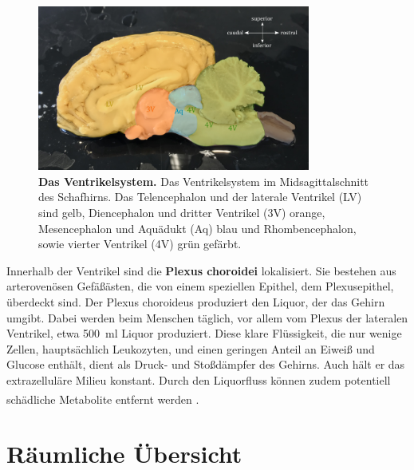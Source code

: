 \documentclass[12pt,a4paper,pdftex]{article}
\begin{document}
\begin{figure}[H]
	\centering
	\includegraphics[width=0.8\textwidth]{pictures/Bilder_Jule/Andere/ventrikelsystem.png}
	\caption[Das Ventrikelsystem]{\textbf{Das Ventrikelsystem.} Das Ventrikelsystem im Midsagittalschnitt des Schafhirns. Das Telencephalon und der laterale Ventrikel (LV) sind gelb, Diencephalon und dritter Ventrikel (3V) orange, Mesencephalon und Aquädukt (Aq) blau und Rhombencephalon, sowie vierter Ventrikel (4V) grün gefärbt.}
	\label{fig:ventrikelsystem}
\end{figure}

\noindent Innerhalb der Ventrikel sind die \textbf{Plexus choroidei}  lokalisiert. Sie bestehen aus arterovenösen Gefäßästen, die von einem speziellen Epithel, dem Plexusepithel, überdeckt sind. Der Plexus choroideus produziert den Liquor, der das Gehirn umgibt. Dabei werden beim Menschen täglich, vor allem vom Plexus der lateralen Ventrikel, etwa 500~ml Liquor produziert. Diese klare Flüssigkeit, die nur wenige Zellen, hauptsächlich Leukozyten, und einen geringen Anteil an Eiweiß und Glucose enthält, dient als Druck- und Stoßdämpfer des Gehirns. Auch hält er das extrazelluläre Milieu konstant. Durch den Liquorfluss können zudem potentiell schädliche Metabolite entfernt werden \textsuperscript{\cite[10]{trepel2011neuroanatomie}}. 

\newpage
\section{Räumliche Übersicht}
\label{sec:raeumliche_uebersicht}
\end{document}
